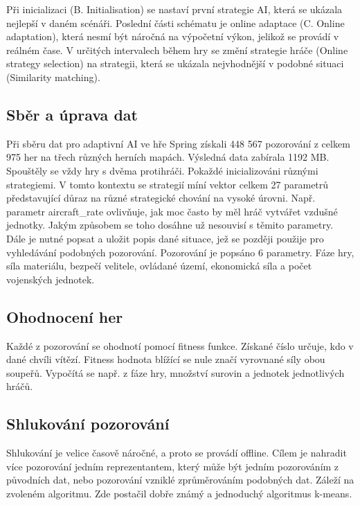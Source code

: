 Při inicializaci (B. Initialisation) se nastaví první strategie AI, která se ukázala nejlepší v daném scénáři. Poslední části schématu je online adaptace (C. Online adaptation), která nesmí být náročná na výpočetní výkon, jelikož se provádí v reálném čase. V určitých intervalech během hry se změní strategie hráče (Online strategy selection) na strategii, která se ukázala nejvhodnější v podobné situaci (Similarity matching).

\subsection{Sběr a úprava dat}

Při sběru dat pro adaptivní AI ve hře Spring získali 448 567 pozorování z celkem 975 her na třech různých herních mapách. Výsledná data zabírala 1192 MB. Spouštěly se vždy hry s dvěma protihráči. Pokaždé inicializováni různými strategiemi. V tomto kontextu se strategií míní vektor celkem 27 parametrů představující důraz na různé strategické chování na vysoké úrovni. Např. parametr aircraft\_rate ovlivňuje, jak moc často by měl hráč vytvářet vzdušné jednotky. Jakým způsobem se toho dosáhne už nesouvisí s těmito parametry. Dále je nutné popsat a uložit popis dané situace, jež se později použije pro vyhledávání podobných pozorování. Pozorování je popsáno 6 parametry. Fáze hry, síla materiálu, bezpečí velitele, ovládané území, ekonomická síla a počet vojenských jednotek.

\subsection{Ohodnocení her}

Každé z pozorování se ohodnotí pomocí fitness funkce. Získané číslo určuje, kdo v dané chvíli vítězí. Fitness hodnota blížící se nule značí vyrovnané síly obou soupeřů. Vypočítá se např. z fáze hry, množství surovin a jednotek jednotlivých hráčů.

\subsection{Shlukování pozorování}

Shlukování je velice časově náročné, a proto se provádí offline. Cílem je nahradit více pozorování jedním reprezentantem, který může být jedním pozorováním z původních dat, nebo pozorování vzniklé zprůměrováním podobných dat. Záleží na zvoleném algoritmu. Zde postačil dobře známý a jednoduchý algoritmus k-means\cite{kmeans}.


